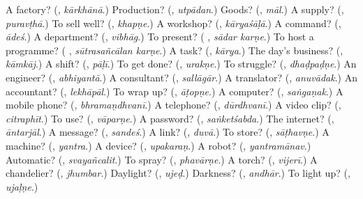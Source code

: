\begin{tcolorbox}[breakable,colback=teal!4,colframe=teal!35!black,title={Before you move on}]
A factory? (\textbf{}, \emph{kārkhānā}.) Production? (\textbf{}, \emph{utpādan}.) Goods? (\textbf{}, \emph{māl}.) A supply? (\textbf{}, \emph{puravṭhā}.) To sell well? (\textbf{}, \emph{khapṇe}.) A workshop? (\textbf{}, \emph{kāryaśāḷā}.) A command? (\textbf{}, \emph{ādeś}.) A department? (\textbf{}, \emph{vibhāg}.) To present? (\textbf{ }, \emph{sādar karṇe}.) To host a programme? (\textbf{ }, \emph{sūtrasañcālan karṇe}.) A task? (\textbf{}, \emph{kārya}.) The day's business? (\textbf{}, \emph{kāmkāj}.) A shift? (\textbf{}, \emph{pāḷī}.) To get done? (\textbf{}, \emph{urakṇe}.) To struggle? (\textbf{}, \emph{dhaḍpaḍṇe}.) An engineer? (\textbf{}, \emph{abhiyantā}.) A consultant? (\textbf{}, \emph{sallāgār}.) A translator? (\textbf{}, \emph{anuvādak}.) An accountant? (\textbf{}, \emph{lekhāpāl}.) To wrap up? (\textbf{}, \emph{āṭopṇe}.) A computer? (\textbf{}, \emph{saṅgaṇak}.) A mobile phone? (\textbf{}, \emph{bhramaṇdhvanī}.) A telephone? (\textbf{}, \emph{dūrdhvanī}.) A video clip? (\textbf{}, \emph{citraphīt}.) To use? (\textbf{}, \emph{vāparṇe}.) A password? (\textbf{}, \emph{saṅketśabda}.) The internet? (\textbf{}, \emph{āntarjāl}.) A message? (\textbf{}, \emph{sandeś}.) A link? (\textbf{}, \emph{duvā}.) To store? (\textbf{}, \emph{sāṭhavṇe}.) A machine? (\textbf{}, \emph{yantra}.) A device? (\textbf{}, \emph{upakaraṇ}.) A robot? (\textbf{}, \emph{yantramānav}.) Automatic? (\textbf{}, \emph{svayañcalit}.) To spray? (\textbf{}, \emph{phavārṇe}.) A torch? (\textbf{}, \emph{vijerī}.) A chandelier? (\textbf{}, \emph{jhumbar}.) Daylight? (\textbf{}, \emph{ujeḍ}.) Darkness? (\textbf{}, \emph{andhār}.) To light up? (\textbf{}, \emph{ujaḷṇe}.)
\end{tcolorbox}
